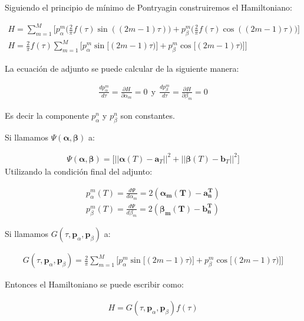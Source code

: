 Siguiendo el principio de mínimo de Pontryagin construiremos el Hamiltoniano:

\begin{gather}
    H = \sum_{m=1}^M \Bigg[ p_\alpha^m \Bigg(\frac{2}{\pi} f(\tau) \sin((2m-1)\tau)\Bigg) + p_\beta^m \Bigg(\frac{2}{\pi} f(\tau) \cos((2m-1)\tau)\Bigg) \Bigg] \\
    H = \frac{2}{\pi} f(\tau)\sum_{m=1}^M \Bigg[  p_\alpha^m   \sin \big[(2m-1)\tau)\big] 
                                                + p_\beta^m   \cos \big[ (2m-1)\tau)\big] \Bigg]
\end{gather}
 
La ecuación de adjunto se puede calcular de la siguiente manera:

\begin{gather}
    \frac{d p_\alpha^m}{d \tau} = \frac{\partial H }{\partial \alpha_m} = 0 \ \ \text{y} \ \    \frac{d p_\beta^m}{d \tau} = \frac{\partial H }{\partial \beta_m} = 0  
\end{gather}

Es decir la componente $p_\alpha^n$ y $p_\beta^n$ son constantes.
\newline

Si llamamos $\Psi(\bm{\alpha},\bm{\beta})$ a:

\begin{gather}
    \Psi(\bm{\alpha},\bm{\beta}) = \big[  || \bm{\alpha}(T) - \bm{a}_T ||^2  + || \bm{\beta}(T) - \bm{b}_T ||^2 \big]
\end{gather}
Utilizando la condición final del adjunto:

\begin{gather}
    p_\alpha^m(T) = \frac{d\Psi}{d\alpha_m} = 2(\bm{\alpha_m(T) - \bm{a}^T_n})\\
    p_\beta^m(T) = \frac{d\Psi}{d\beta_m} = 2(\bm{\beta_m(T) - \bm{b}^T_n})
\end{gather}


Si llamamos $G(\tau,\bm{p}_\alpha,\bm{p}_\beta)$ a:

\begin{gather}
    G(\tau,\bm{p}_\alpha,\bm{p}_\beta) =  \frac{2}{\pi}\sum_{m=1}^M \Bigg[  p_\alpha^m   \sin \big[(2m-1)\tau)\big] 
    + p_\beta^m   \cos \big[ (2m-1)\tau)\big] \Bigg]
\end{gather}

Entonces el Hamiltoniano se puede escribir como: 

\begin{gather}
    H = G(\tau,\bm{p}_\alpha,\bm{p}_\beta) f(\tau)
\end{gather}

